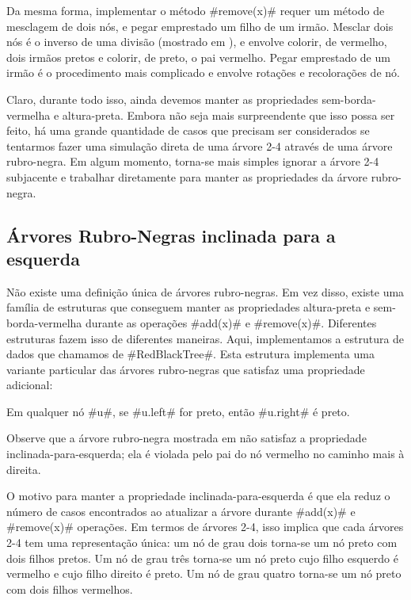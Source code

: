 Da mesma forma, implementar o método #remove(x)# requer um método de mesclagem 
de dois nós, e pegar emprestado um filho de um irmão. Mesclar dois nós é o inverso de
uma divisão (mostrado em ), e envolve colorir, de vermelho, dois
irmãos pretos e colorir, de preto, o pai vermelho. Pegar emprestado de
um irmão é o procedimento mais complicado e envolve
rotações e recolorações de nó.

Claro, durante todo isso, ainda devemos manter as propriedades sem-borda-vermelha
e altura-preta. Embora não seja mais surpreendente que isso possa ser feito,
há uma grande quantidade de casos que precisam ser considerados se tentarmos 
fazer uma simulação direta de uma árvore 2-4 através de uma
árvore rubro-negra. Em algum momento, torna-se mais simples ignorar a
árvore 2-4 subjacente e trabalhar diretamente para manter as propriedades
da árvore rubro-negra.

\subsection{Árvores Rubro-Negras inclinada para a esquerda}

%
%
Não existe uma definição única de árvores rubro-negras. Em vez disso, existe
uma família de estruturas que conseguem manter as propriedades altura-preta
e sem-borda-vermelha durante as operações #add(x)# e #remove(x)#. 
Diferentes estruturas fazem isso de diferentes maneiras.
Aqui, implementamos a estrutura de dados que chamamos de #RedBlackTree#.
%
Esta estrutura implementa uma variante particular das árvores rubro-negras que
satisfaz uma propriedade adicional:
\begin{prp}
	Em qualquer nó #u#, se #u.left# for preto, então #u.right# é preto.
\end{prp}
Observe que a árvore rubro-negra mostrada em  não
satisfaz a propriedade inclinada-para-esquerda; ela é violada pelo pai do
nó vermelho no caminho mais à direita.

O motivo para manter a propriedade inclinada-para-esquerda é que ela reduz
o número de casos encontrados ao atualizar a árvore durante #add(x)#
e #remove(x)# operações. Em termos de árvores 2-4, isso implica que cada
árvores 2-4 tem uma representação única: um nó de grau dois torna-se
um nó preto com dois filhos pretos. Um nó de grau três torna-se
um nó preto cujo filho esquerdo é vermelho e cujo filho direito é preto.
Um nó de grau quatro torna-se um nó preto com dois filhos vermelhos.

